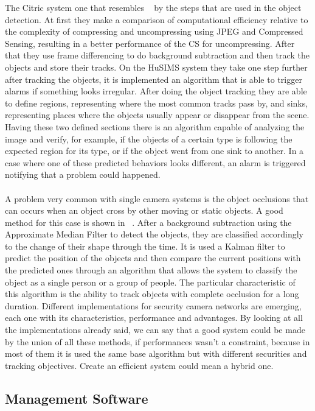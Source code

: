 \documentclass[journal,transmag]{IEEEtran}
\begin{document}
The Citric system one that resembles ~\cite{CS-MoG} by the steps that are used in the object detection. At first they make a comparison of
computational efficiency relative to the complexity of compressing and uncompressing using JPEG and Compressed Sensing, resulting in a better
performance of the CS  for uncompressing. After that they use frame differencing to do background subtraction and then track the objects and store
their tracks. On the HuSIMS system they take one step further after tracking the objects, it is implemented an algorithm that is able to trigger alarms
if something looks irregular. After doing the object tracking they are able to define regions, representing where the most common tracks pass by, and
sinks, representing places where the objects usually appear or disappear from the scene. Having these two defined sections there is an algorithm
capable of analyzing the image and verify, for example, if the objects of a certain type is following the expected region for its type, or if the
object went from one sink to another. In a case where one of these predicted behaviors looks different, an alarm is triggered notifying that a problem
could happened. \\ \\
A problem very common with single camera systems is the object occlusions that can occurs when an object cross by other moving or static objects. A
good method for this case is shown in ~\cite{Occlusion}. After a background subtraction using the Approximate Median Filter to detect the objects, they
are classified accordingly to the change of their shape through the time. It is used a Kalman filter to predict the position of the objects and then 
compare the current positions with the predicted ones through an algorithm that allows the system to classify the object as a single person or a group 
of people. The particular characteristic of this algorithm is the ability to track objects with complete occlusion for a long duration.
Different implementations for security camera networks are emerging, each one with its characteristics, performance and advantages. By looking at all 
the implementations already said, we can say that a good system could be made by the union of all these methods, if performances wasn’t a constraint, 
because in most of them it is used the same base algorithm but with different securities and tracking objectives. Create an efficient system could mean 
a hybrid one.
\subsection{Management Software}
\end{document}
